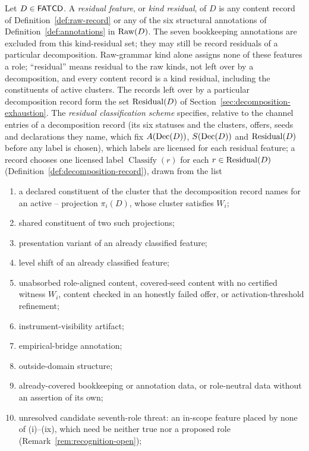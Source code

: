 \begin{definition}\label{def:residual-scheme}
Let \(D \in \mathsf{FATCD}{}\). A \emph{residual feature}, or \emph{kind residual}, of \(D\) is
any content record of Definition~\ref{def:raw-record} or any of the six
structural annotations of Definition~\ref{def:annotations} in \(\operatorname{Raw}\!\left(D\right)\). The
seven bookkeeping annotations are excluded from this kind-residual set; they
may still be record residuals of a particular decomposition. Raw-grammar kind
alone assigns none of these features a role; ``residual'' means residual to
the raw kinds, not left over by a decomposition, and every content record is a
kind residual, including the constituents of active clusters. The records left
over by a particular decomposition record form the set \(\operatorname{Residual}\!\left(D\right)\) of
Section~\ref{sec:decomposition-exhaustion}. The \emph{residual classification scheme}
specifies, relative to the channel entries of a decomposition record (its six
statuses and the clusters, offers, seeds and declarations they name, which fix
\(A(\operatorname{Dec}\!\left(D\right))\), \(S(\operatorname{Dec}\!\left(D\right))\) and \(\operatorname{Residual}\!\left(D\right)\) before any label is chosen),
which labels are licensed for each residual feature; a record chooses one licensed label
\(\operatorname{Classify}(r)\) for each \(r\in\operatorname{Residual}\!\left(D\right)\)
(Definition~\ref{def:decomposition-record}), drawn from the list
\begin{enumerate}[label=(\roman*),topsep=2pt,itemsep=1pt]
  \item a declared constituent of the cluster that the decomposition record
    names for an active \Pone{}--\Psix{} projection \(\pi_i(D)\), whose
    cluster satisfies \(W_i\);
  \item shared constituent of two such projections;
  \item presentation variant of an already classified feature;
  \item level shift of an already classified feature;
  \item unabsorbed role-aligned content, covered-seed content with no
    certified witness \(W_i\), content checked in an honestly failed offer, or activation-threshold refinement;
  \item instrument-visibility artifact;
  \item empirical-bridge annotation;
  \item outside-domain structure;
  \item already-covered bookkeeping or annotation data, or role-neutral data
    without an assertion of its own;
  \item unresolved candidate seventh-role threat: an in-scope feature placed by none of (i)--(ix), which need be neither true nor a proposed role (Remark~\ref{rem:recognition-open});

\end{enumerate}
\end{definition}
